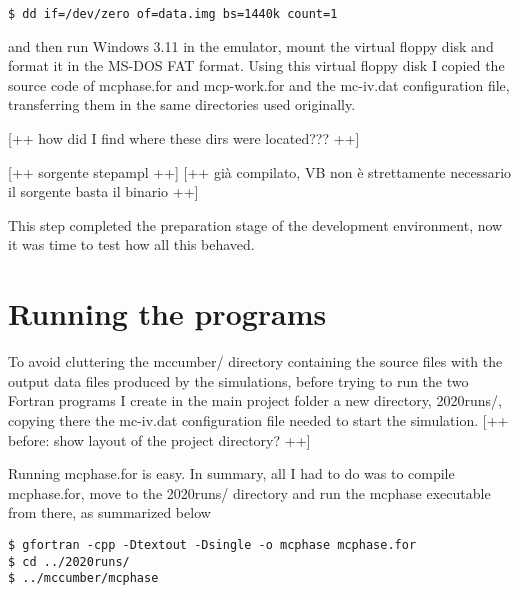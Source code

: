 \begin{lstlisting}
$ dd if=/dev/zero of=data.img bs=1440k count=1
\end{lstlisting}


and then run Windows 3.11 in the emulator, mount the virtual floppy disk and format it in the MS-DOS FAT format.
Using this virtual floppy disk I copied the source code of \textsf{mcphase.for} and \textsf{mcp-work.for} and the \textsf{mc-iv.dat} configuration file, transferring them in the same directories used originally.

[++ how did I find where these dirs were located??? ++]

[++ sorgente stepampl  ++] [++ già compilato, VB non è strettamente necessario il sorgente basta il binario ++]

This step completed the preparation stage of the development environment, now it was time to test how all this behaved.



\section{Running the programs}

To avoid cluttering the \textsf{mccumber/} directory containing the source files with the output data files produced by the simulations, before trying to run the two Fortran programs I create in the main project folder a new directory, \textsf{2020runs/}, copying there the \textsf{mc-iv.dat} configuration file needed to start the simulation.
[++ before: show layout of the project directory? ++]

Running \textsf{mcphase.for} is easy. In summary, all I had to do was to compile \textsf{mcphase.for}, move to the \textsf{2020runs/} directory and run the \textsf{mcphase} executable from there, as summarized below

\begin{lstlisting}
$ gfortran -cpp -Dtextout -Dsingle -o mcphase mcphase.for
$ cd ../2020runs/
$ ../mccumber/mcphase
\end{lstlisting}


